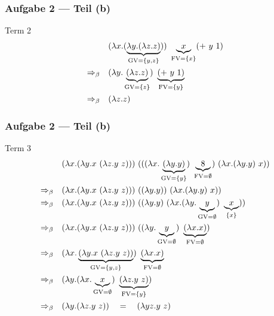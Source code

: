 \documentclass{beamer}
\DeclareMathOperator{\GV}{GV}
\DeclareMathOperator{\FV}{FV}
\begin{document}
\begin{frame}[t] \frametitle{Aufgabe 2 --- Teil (b)}
	 Term 2
	\begin{align*}
		& (\lambda x . (\underbrace{\lambda y . (\lambda z . z)}_{\GV=\menge{y,z}})) \ \underbrace{x}_{\FV = \menge{x}} ( + \ y \ 1)
		\\
		\Rightarrow_\beta \quad
		& (\lambda y . \underbrace{(\lambda z . z)}_{\GV=\menge{z}}) \ \underbrace{( + \ y \ 1)}_{\FV = \menge{y}}
		\\
		\Rightarrow_\beta \quad
		& (\lambda z . z)
	\end{align*}
\end{frame}


\begin{frame}[t] \frametitle{Aufgabe 2 --- Teil (b)}
	\small
	Term 3
	\begin{align*}
		& (\lambda x . (\lambda y . x \ (\lambda z . y \ z))) \ (((\lambda x . \underbrace{(\lambda y . y )}_{\GV= \menge{y}}) \ \underbrace{8}_{\FV = \emptyset} ) \ (\lambda x . (\lambda y . y) \ x ))
		\\
		\Rightarrow_\beta \quad
		& (\lambda x . (\lambda y . x \ (\lambda z . y \ z))) \ ((\lambda y . y )) \ (\lambda x . (\lambda y . y) \ x ))
		\\
		\Rightarrow_\beta \quad
		& (\lambda x . (\lambda y . x \ (\lambda z . y \ z))) \ ((\lambda y . y ) \ (\lambda x . (\lambda y . \underbrace{y}_{\GV=\emptyset}) \ \underbrace{x}_{\menge{x}} ))
		\\
		\Rightarrow_\beta \quad
		& (\lambda x . (\lambda y . x \ (\lambda z . y \ z))) \ ((\lambda y . \underbrace{y}_{\GV = \emptyset} ) \ \underbrace{(\lambda x . x)}_{\FV = \emptyset})
		\\
		\Rightarrow_\beta \quad
		& (\lambda x . \underbrace{(\lambda y . x \ (\lambda z . y \ z))}_{\GV = \menge{y,z}}) \ \underbrace{(\lambda x . x)}_{\FV = \emptyset}
		\\
		\Rightarrow_\beta \quad
		& (\lambda y . (\lambda x . \underbrace{x}_{\GV = \emptyset}) \ \underbrace{(\lambda z . y \ z)}_{\FV = \menge{y}})
		\\
		\Rightarrow_\beta \quad
		& (\lambda y . (\lambda z . y \ z)) 
		\quad = \quad
		(\lambda yz . y \ z) 
	\end{align*}
\end{frame}
\end{document}
